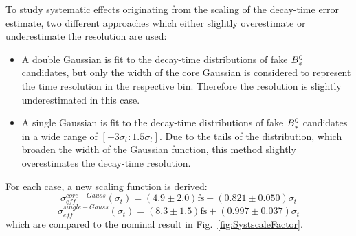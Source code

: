To study systematic effects originating from the scaling of the decay-time error estimate, 
two different approaches which either slightly overestimate or underestimate the resolution are used:
\begin{itemize}

\item A double Gaussian is fit to the decay-time distributions of fake ${{B}^0_{s}}$ candidates, but only the width of the core Gaussian is considered to represent the time resolution in the respective bin. 
Therefore the resolution is slightly underestimated in this case.

\item A single Gaussian is fit to the decay-time distributions of fake ${{B}^0_{s}}$ candidates in a wide range of $[-3\sigma_{t} : 1.5\sigma_{t}]$. 
Due to the tails of the distribution, which broaden the width of the Gaussian function, this method slightly overestimates the decay-time resolution.   

\end{itemize}
%
For each case, a new scaling function is derived: 
\begin{equation}
\sigma_{eff}^{core-Gauss}(\sigma_t) = \left(4.9  \pm 2.0 \right) \text{fs} + \left( 0.821 \pm 0.050 \right) \sigma_t
\label{eq:ResoSyst1}
\end{equation}
%
\begin{equation}
\sigma_{eff}^{single-Gauss}(\sigma_t) = \left(8.3  \pm 1.5 \right) \text{fs} + \left( 0.997 \pm 0.037 \right) \sigma_t
\label{eq:ResoSyst2}
\end{equation}
which are compared to the nominal result in Fig.~\ref{fig:SystscaleFactor}.


